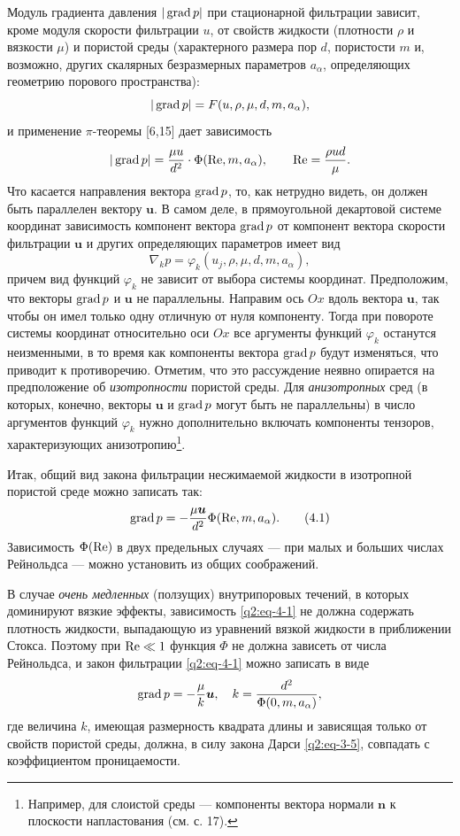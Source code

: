 Модуль градиента давления $|\operatorname{grad} p|$ при стационарной фильтрации зависит, кроме модуля скорости фильтрации $u$, от свойств жидкости (плотности $\rho$ и вязкости $\mu$) и пористой среды (характерного размера пор $d$, пористости $m$ и, возможно, других скалярных безразмерных параметров $a_\alpha$, определяющих геометрию
порового пространства):
\[
|\operatorname{grad} p|=F(u,\rho,\mu,d,m,a_\alpha),
\]
и применение $\pi$-теоремы [6,15] дает зависимость
\[
|\operatorname{grad} p|=\frac{\mu u}{d^2}\cdot\Phi(\mathrm{Re},m,a_\alpha),\qquad \mathrm{Re}=\frac{\rho ud}{\mu}.
\]
Что касается направления вектора $\operatorname{grad} p$, то, как нетрудно видеть, он должен быть параллелен вектору $\boldsymbol{u}$. В самом деле, в прямоугольной декартовой системе координат зависимость компонент вектора $\operatorname{grad} p$ от компонент вектора скорости фильтрации $\boldsymbol{u}$ и других определяющих параметров имеет вид
\[
\nabla_kp=\varphi_k(u_j,\rho,\mu,d,m,a_\alpha),
\]
причем вид функций $\varphi_k$ не зависит от выбора системы координат. Предположим, что векторы $\operatorname{grad} p$ и $\boldsymbol{u}$ не параллельны. Направим ось $Ox$ вдоль вектора $\boldsymbol{u}$, так чтобы он имел только одну отличную от нуля компоненту. Тогда при повороте системы координат относительно оси $Ox$ все аргументы функций $\varphi_k$ останутся неизменными, в то время как компоненты вектора $\operatorname{grad} p$ будут изменяться, что приводит к противоречию. Отметим, что это рассуждение неявно опирается на предположение об \textit{изотропности} пористой среды. Для \textit{анизотропных} сред (в которых, конечно, векторы $\boldsymbol{u}$ и $\operatorname{grad} p$ могут быть не параллельны) в число аргументов функций $\varphi_k$ нужно дополнительно включать компоненты тензоров, характеризующих анизотропию\setcounter{footnote}{0}\footnote{Например, для слоистой среды --- компоненты вектора нормали $\boldsymbol{n}$ к плоскости напластования (см. с. 17).}.

Итак, общий вид закона фильтрации несжимаемой жидкости в изотропной пористой среде можно записать так:
\begin{equation}
\operatorname{grad} p=-\frac{\mu\boldsymbol{u}}{d^2}\Phi(\mathrm{Re},m,a_\alpha).
\tag{4.1}\label{q2:eq-4-1}
\end{equation}
Зависимость $\Phi(\mathrm{Re})$ в двух предельных случаях --- при малых и больших числах Рейнольдса --- можно установить из общих соображений.

В случае \textit{очень медленных} (ползущих) внутрипоровых течений, в которых доминируют вязкие эффекты, зависимость \eqref{q2:eq-4-1}
не должна содержать плотность жидкости, выпадающую из уравнений вязкой жидкости в приближении Стокса. Поэтому при $\mathrm{Re}\ll1$ функция $\Phi$ не должна зависеть от числа Рейнольдса, и закон фильтрации \eqref{q2:eq-4-1} можно записать в виде
\[
\operatorname{grad} p=-\frac{\mu}{k}\boldsymbol{u},\quad k=\frac{d^2}{\Phi(0,m,a_\alpha)},
\]
где величина $k$, имеющая размерность квадрата длины и зависящая только от свойств пористой среды, должна, в силу закона Дарси \eqref{q2:eq-3-5}, совпадать с коэффициентом проницаемости.


